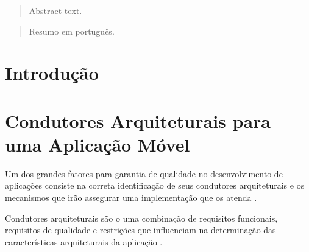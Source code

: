 \documentclass[
	article,			%
	11pt,				%
	oneside,			%
	a4paper,			%
	english,			%
	brazil,				%
	sumario=tradicional
]{abntex2}
\begin{document}
\maketitle

\begin{abstract}
Abstract text.
\end{abstract}


\begin{abstract}
Resumo em português.
\end{abstract}

\tableofcontents

\section{Introdução} \label{introduction}

\section{Condutores Arquiteturais para uma Aplicação Móvel}
Um dos grandes fatores para garantia de qualidade no desenvolvimento de aplicações consiste na correta identificação de seus condutores arquiteturais e os mecanismos que irão assegurar uma implementação que os atenda \cite{bachmann2001introduction}.

Condutores arquiteturais são o uma combinação de requisitos funcionais, requisitos de qualidade e restrições que influenciam na determinação das características arquiteturais da aplicação \cite{bachmann2001introduction}.
\end{document}
